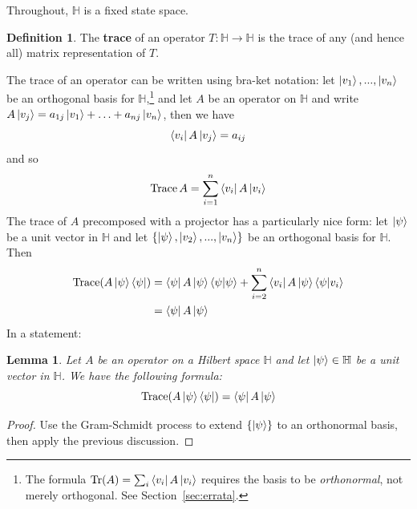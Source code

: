 \documentclass[12pt]{article}
\theoremstyle{plain}
\newtheorem{lemma}[thm]{Lemma}
\theoremstyle{definition}
\newtheorem{defn}[thm]{Definition} %
\newcommand{\bb}[1]{\mathbb{#1}}
\newcommand{\lto}{\longrightarrow}
\begin{document}
Throughout, $\bb{H}$ is a fixed state space.
\begin{defn}
The \textbf{trace} of an operator $T: \bb{H} \lto \bb{H}$ is the trace of any (and hence all) matrix representation of $T$.
\end{defn}
The trace of an operator can be written using bra-ket notation: let $\ket{v_1},...,\ket{v_n}$ be an orthogonal basis for $\bb{H}$,\footnote{The formula $\operatorname{Tr}(A)=\sum_i\bra{v_i}A\ket{v_i}$ requires the basis to be \emph{orthonormal}, not merely orthogonal. See Section~\ref{sec:errata}.} and let $A$ be an operator on $\bb{H}$ and write $A\ket{v_j} = a_{1j}\ket{v_1} + \hdots + a_{nj}\ket{v_n}$, then we have
\begin{equation}
\bra{v_i}A\ket{v_j} = a_{ij}
\end{equation}
and so
\begin{equation}
\operatorname{Trace}A = \sum_{i = 1}^n \bra{v_i}A\ket{v_i}
\end{equation}
The trace of $A$ precomposed with a projector has a particularly nice form: let $\ket{\psi}$ be a unit vector in $\bb{H}$ and let $\lbrace \ket{\psi},\ket{v_2},...,\ket{v_n}\rbrace$ be an orthogonal basis for $\bb{H}$. Then
\begin{align*}
\operatorname{Trace}(A\ket{\psi}\bra{\psi}) &= \bra{\psi}A\ket{\psi}\bra{\psi}\ket{\psi} + \sum_{i = 2}^n \bra{v_i}A\ket{\psi}\bra{\psi}\ket{v_i}\\
&= \bra{\psi}A\ket{\psi}
\end{align*}
In a statement:
\begin{lemma}\label{lem:trace_evaluation}
Let $A$ be an operator on a Hilbert space $\bb{H}$ and let $\ket{\psi} \in \bb{H}$ be a unit vector in $\bb{H}$. We have the following formula:
\begin{equation}
\operatorname{Trace}(A\ket{\psi}\bra{\psi}) = \bra{\psi}A\ket{\psi}
\end{equation}
\end{lemma}
\begin{proof}
Use the Gram-Schmidt process to extend $\lbrace \ket{\psi}\rbrace$ to an orthonormal basis, then apply the previous discussion.
\end{proof}
\end{document}
